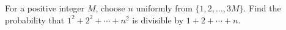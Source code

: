 For a positive integer $M$, choose $n$ uniformly from $\{1,2,\ldots,3M\}$. Find the probability that $1^2+2^2+\cdots+n^2$ is divisible by $1+2+\cdots+n$.
